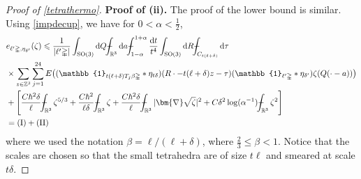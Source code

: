 \documentclass[final,onefignum,onetabnum,reqno]{amsart}
\theoremstyle{remark}
\renewcommand{\le}{\leqslant}
\newcommand{\RR}{\mathbb{R}}
\newcommand{\ZZ}{\mathbb{Z}}
\newcommand{\SO}{\mathrm{SO}}
\newcommand{\iden}{\mathbb{1}} %
\newcommand{\grad}{\bm{\nabla}} %
\newcommand{\tetra}{\mathbb{\Delta}} %
\newcommand{\dd}{\mathrm{d}} %
\def\Xint#1{\mathchoice
{\XXint\displaystyle\textstyle{#1}}%
{\XXint\textstyle\scriptstyle{#1}}%
{\XXint\scriptstyle\scriptscriptstyle{#1}}%
{\XXint\scriptscriptstyle\scriptscriptstyle{#1}}%
\!\int}
\def\XXint#1#2#3{{\setbox0=\hbox{$#1{#2#3}{\int}$ }
\vcenter{\hbox{$#2#3$ }}\kern-.6\wd0}}
\def\dashint{\Xint-}
\begin{document}
\begin{proof}[Proof of \cref{tetrathermo}]
\vspace{.3em}
\noindent\textbf{Proof of (ii).} The proof of the lower bound is similar. Using \cref{impdecup}, we have for $0<\alpha<\frac{1}{2}$, 
\begin{equation}\label{etetraup}
\begin{aligned}
&e_{\ell'\tetra,\eta_{\delta'}}(\zeta)\le\frac{1}{|\ell'\tetra|}\int_{\SO(3)}\dd Q \dashint_{\RR^3}\dd a \dashint_{1-\alpha}^{1+\alpha}\frac{\dd t}{t^4} \int_{\SO(3)}\dd R 
\dashint_{C_{t(\ell+\delta)}}\dd\tau\\
	&\times \sum_{z\in\ZZ^3} \sum_{j=1}^{24} E\bigl((\iden_{t(\ell+\delta) T_j \beta\tetra} * \eta_{t \delta})(R\cdot - t(\ell+\delta) z - \tau)(\iden_{\ell'\tetra}*\eta_{\delta'})\zeta(Q(\cdot - a))\bigr)\\
	&+\Biggl[\frac{C\hbar^2\delta}{\ell} \dashint_{\RR^3}\zeta^{5/3} +  \frac{C\hbar^2}{\ell\delta} \dashint_{\RR^3} \zeta + \frac{C\hbar^2\delta}{\ell}\dashint_{\RR^3} |\grad\sqrt{\zeta}|^2 + C\delta^2\log(\alpha^{-1}) \dashint_{\RR^3}\zeta^2\Biggr]\\
    &=\mathrm{(I)} + \mathrm{(II)}
\end{aligned}
\end{equation}
where we used the notation $\beta=\ell/(\ell+\delta)$, where $\frac{2}{3}\le\beta<1$. Notice that the scales are chosen so that the small tetrahedra are of size $t\ell$ and smeared at scale $t\delta$.


\end{proof}
\end{document}

